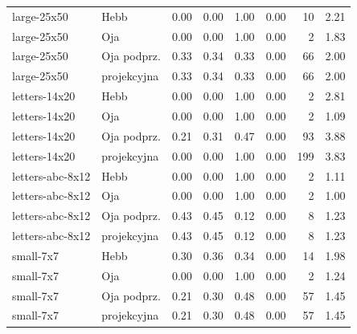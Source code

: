 \begin{tabular}{llrrrrrr}
large-25x50 & Hebb & 0.00 & 0.00 & 1.00 & 0.00 & 10 & 2.21 \\

large-25x50 & Oja & 0.00 & 0.00 & 1.00 & 0.00 & 2 & 1.83 \\

large-25x50 & Oja podprz. & 0.33 & 0.34 & 0.33 & 0.00 & 66 & 2.00 \\

large-25x50 & projekcyjna & 0.33 & 0.34 & 0.33 & 0.00 & 66 & 2.00 \\

letters-14x20 & Hebb & 0.00 & 0.00 & 1.00 & 0.00 & 2 & 2.81 \\

letters-14x20 & Oja & 0.00 & 0.00 & 1.00 & 0.00 & 2 & 1.09 \\

letters-14x20 & Oja podprz. & 0.21 & 0.31 & 0.47 & 0.00 & 93 & 3.88 \\

letters-14x20 & projekcyjna & 0.00 & 0.00 & 1.00 & 0.00 & 199 & 3.83 \\

letters-abc-8x12 & Hebb & 0.00 & 0.00 & 1.00 & 0.00 & 2 & 1.11 \\

letters-abc-8x12 & Oja & 0.00 & 0.00 & 1.00 & 0.00 & 2 & 1.00 \\

letters-abc-8x12 & Oja podprz. & 0.43 & 0.45 & 0.12 & 0.00 & 8 & 1.23 \\

letters-abc-8x12 & projekcyjna & 0.43 & 0.45 & 0.12 & 0.00 & 8 & 1.23 \\

small-7x7 & Hebb & 0.30 & 0.36 & 0.34 & 0.00 & 14 & 1.98 \\

small-7x7 & Oja & 0.00 & 0.00 & 1.00 & 0.00 & 2 & 1.24 \\

small-7x7 & Oja podprz. & 0.21 & 0.30 & 0.48 & 0.00 & 57 & 1.45 \\

small-7x7 & projekcyjna & 0.21 & 0.30 & 0.48 & 0.00 & 57 & 1.45 \\

\bottomrule

\end{tabular}

